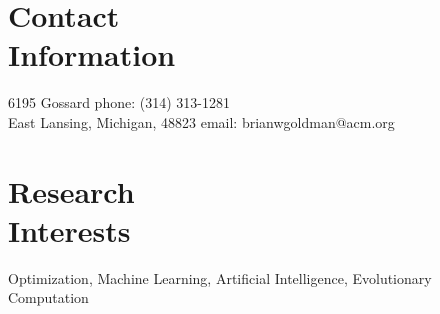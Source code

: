 \documentclass[margin,line]{resume}
\begin{document}
\begin{resume}

    \section{\mysidestyle Contact\\Information}

    6195 Gossard                            \hfill phone: (314) 313-1281          \vspace{0mm}\\\vspace{0mm}%
    East Lansing, Michigan, 48823                          \hfill email: brianwgoldman@acm.org          %
    \section{\mysidestyle Research\\Interests}
    Optimization, Machine Learning, Artificial Intelligence, Evolutionary Computation


\end{resume}
\end{document}
